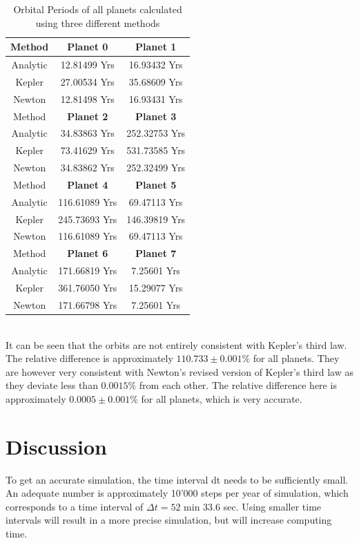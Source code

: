 \documentclass[reprint,english,notitlepage]{revtex4-2}
\begin{document}
\begin{table}[h]
    \begin{tabular}{ |c|c|c| }
        \hline
		Method & \textbf{Planet 0} & \textbf{Planet 1}\\
		\hline
        Analytic	& 12.81499 Yrs & 16.93432 Yrs\\
		Kepler		& 27.00534 Yrs & 35.68609 Yrs\\
		Newton		& 12.81498 Yrs & 16.93431 Yrs\\
		\hline\hline
		Method & \textbf{Planet 2} & \textbf{Planet 3}\\
		\hline
        Analytic	& 34.83863 Yrs & 252.32753 Yrs\\
		Kepler		& 73.41629 Yrs & 531.73585 Yrs\\
		Newton		& 34.83862 Yrs & 252.32499 Yrs\\
		\hline\hline
		Method & \textbf{Planet 4} & \textbf{Planet 5}\\
		\hline
        Analytic	& 116.61089 Yrs & 69.47113 Yrs\\
		Kepler		& 245.73693 Yrs & 146.39819 Yrs\\
		Newton		& 116.61089 Yrs & 69.47113 Yrs\\
		\hline\hline
		Method & \textbf{Planet 6} & \textbf{Planet 7}\\
		\hline
        Analytic	& 171.66819 Yrs & 7.25601 Yrs\\
		Kepler		& 361.76050 Yrs & 15.29077 Yrs\\
		Newton		& 171.66798 Yrs & 7.25601 Yrs\\
		\hline
	\end{tabular}
    \caption{Orbital Periods of all planets calculated using three different methods}
    \label{tab:Kepler3_Table}
\end{table}


\\It can be seen that the orbits are not entirely consistent with Kepler's third law.
The relative difference is approximately $110.733 \pm 0.001\%$ for all planets.
They are however very consistent with Newton's revised version of Kepler's third law as they deviate less than $0.0015\%$ from each other.
The relative difference here is approximately $0.0005 \pm 0.001\%$ for all planets, which is very accurate.
\section{Discussion}
To get an accurate simulation, the time interval dt needs to be sufficiently small.
An adequate number is approximately 10'000 steps per year of simulation, which corresponds to a time interval of $\Delta t = 52$ min $33.6$ sec.
Using smaller time intervals will result in a more precise simulation, but will increase computing time.
\end{document}
